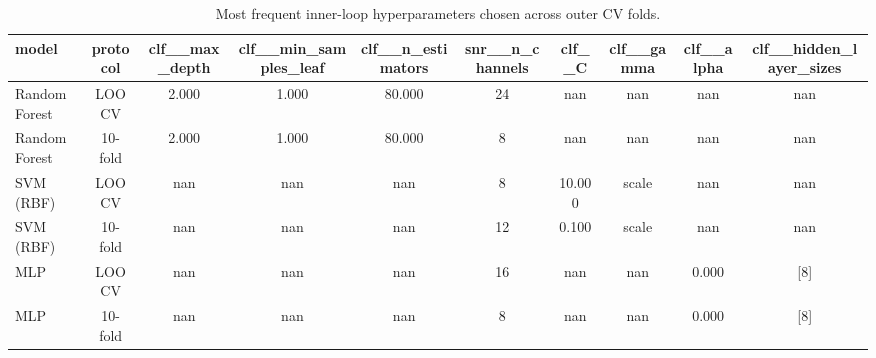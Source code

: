 \begin{table}[!t]
\centering
\caption{Most frequent inner-loop hyperparameters chosen across outer CV folds.}
\label{tab:hparams}
\begin{tabular}{lccccccccc}
\hline
\textbf{model} & \textbf{protocol} & \textbf{clf\_\_max\_depth} & \textbf{clf\_\_min\_samples\_leaf} & \textbf{clf\_\_n\_estimators} & \textbf{snr\_\_n\_channels} & \textbf{clf\_\_C} & \textbf{clf\_\_gamma} & \textbf{clf\_\_alpha} & \textbf{clf\_\_hidden\_layer\_sizes} \\
\hline
Random Forest & LOOCV & 2.000 & 1.000 & 80.000 & 24 & nan & nan & nan & nan \\
Random Forest & 10-fold & 2.000 & 1.000 & 80.000 & 8 & nan & nan & nan & nan \\
SVM (RBF) & LOOCV & nan & nan & nan & 8 & 10.000 & scale & nan & nan \\
SVM (RBF) & 10-fold & nan & nan & nan & 12 & 0.100 & scale & nan & nan \\
MLP & LOOCV & nan & nan & nan & 16 & nan & nan & 0.000 & [8] \\
MLP & 10-fold & nan & nan & nan & 8 & nan & nan & 0.000 & [8] \\
\hline
\end{tabular}
\end{table}
